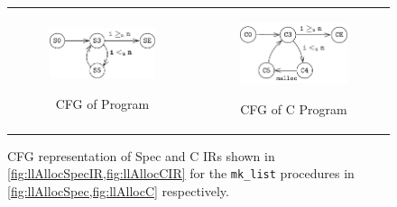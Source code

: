 \begin{figure}
\begin{tabular}{@{}c@{}c@{}}
\begin{subfigure}[b]{0.5\textwidth}
\begin{center}
{\includegraphics[scale=1.4]{chapters/figures/figMallocSpecCfg.pdf}}
\vspace{15pt}
\end{center}
\caption{\label{fig:llAllocSpecIRCFG}CFG of \SpecL{} Program}
\end{subfigure}%
&
\begin{subfigure}[b]{0.5\textwidth}
\begin{center}
{\includegraphics[scale=1.4]{chapters/figures/figMallocCCfg.pdf}}
\end{center}
\caption{\label{fig:llAllocCCFG}CFG of C Program}
\end{subfigure}%
\\
\end{tabular}
\caption{\label{fig:mallocSpecCFGAndCCFG}CFG representation of Spec and C IRs shown in \cref{fig:llAllocSpecIR,fig:llAllocCIR} for the {\tt mk\_list} procedures in \cref{fig:llAllocSpec,fig:llAllocC} respectively.}
\end{figure}
